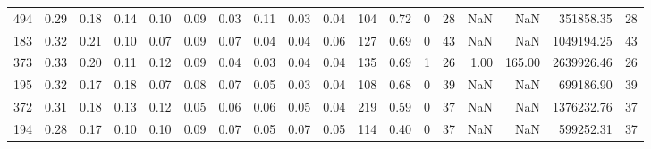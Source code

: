 \begin{tabular}{rrrrrrrrrrllrrrrrr}
          494 & 0.29 & 0.18 & 0.14 & 0.10 & 0.09 & 0.03 & 0.11 & 0.03 & 0.04 & 104 &  0.72 &                  0 &        28 &             NaN &                 NaN &     351858.35 &                    28 \\
          183 & 0.32 & 0.21 & 0.10 & 0.07 & 0.09 & 0.07 & 0.04 & 0.04 & 0.06 & 127 &  0.69 &                  0 &        43 &             NaN &                 NaN &    1049194.25 &                    43 \\
          373 & 0.33 & 0.20 & 0.11 & 0.12 & 0.09 & 0.04 & 0.03 & 0.04 & 0.04 & 135 &  0.69 &                  1 &        26 &            1.00 &              165.00 &    2639926.46 &                    26 \\
          195 & 0.32 & 0.17 & 0.18 & 0.07 & 0.08 & 0.07 & 0.05 & 0.03 & 0.04 & 108 &  0.68 &                  0 &        39 &             NaN &                 NaN &     699186.90 &                    39 \\
          372 & 0.31 & 0.18 & 0.13 & 0.12 & 0.05 & 0.06 & 0.06 & 0.05 & 0.04 & 219 &  0.59 &                  0 &        37 &             NaN &                 NaN &    1376232.76 &                    37 \\
          194 & 0.28 & 0.17 & 0.10 & 0.10 & 0.09 & 0.07 & 0.05 & 0.07 & 0.05 & 114 &  0.40 &                  0 &        37 &             NaN &                 NaN &     599252.31 &                    37 \\
\bottomrule
\end{tabular}
